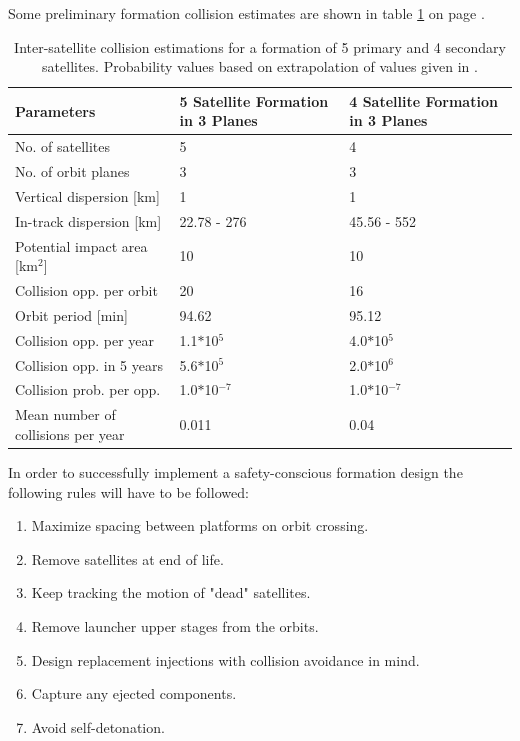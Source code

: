 Some preliminary formation collision estimates are shown in table \ref{table:coll} on page \pageref{table:coll}.

\begin{table}
	\centering
	
		\begin{tabular}{p{5cm}|p{5cm}|p{5cm}}
		\toprule
	\textbf{Parameters} & \textbf{5 Satellite Formation in 3 Planes} & \textbf{4 Satellite Formation in 3 Planes} \\
		\hline \hline
		No. of satellites & 5 & 4 \\
		No. of orbit planes & 3 & 3 \\ 
		Vertical dispersion [km] & 1 & 1 \\
		In-track dispersion [km] & 22.78 - 276 & 45.56 - 552 \\
		Potential impact area [km$^2$] & 10 & 10 \\ 
		Collision opp. per orbit & 20 & 16 \\
		Orbit period [min] & 94.62 & 95.12 \\ 
		Collision opp. per year & 1.1$*$10$^5$ & 4.0$*$10$^5$ \\
		Collision opp. in 5 years & 5.6$*$10$^5$ & 2.0$*$10$^6$ \\
		Collision prob. per opp. & 1.0$*$10$^{-7}$ & 1.0$*$10$^{-7}$ \\
		Mean number of collisions per year & 0.011 & 0.04\\
		\bottomrule
			\end{tabular}
	\caption{Inter-satellite collision estimations for a formation of 5 primary and 4 secondary satellites. Probability values based on extrapolation of values given in \cite{constDesign}.}
	\label{table:coll}
\end{table}

In order to successfully implement a safety-conscious formation design the following rules will have to be followed:
 
\begin{enumerate}
	\item Maximize spacing between platforms on orbit crossing.
	\item Remove satellites at end of life.
	\item Keep tracking the motion of "dead" satellites.
	\item Remove launcher upper stages from the orbits.
	\item Design replacement injections with collision avoidance in mind.
	\item Capture any ejected components.
	\item Avoid self-detonation.
\end{enumerate}
 
